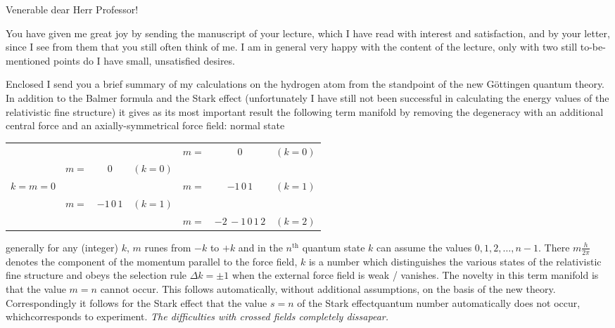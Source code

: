 \date{November 17, 1925}

Venerable dear Herr Professor!

You have given me great joy by sending the manuscript of your lecture, which I have read with interest and satisfaction, and by your letter, since I see from them that you still often think of me. I am in general very happy with the content of the lecture, only with two still to-be-mentioned points do I have small, unsatisfied desires.

Enclosed I send you a brief summary of my calculations on the hydrogen atom from the standpoint of the new G\"ottingen quantum theory. In addition to the Balmer formula and the Stark effect (unfortunately I have still not been successful in calculating the energy values of the relativistic fine structure) it gives as its most important result the following term manifold by removing the degeneracy with an additional central force and an axially-symmetrical force field: normal state
\begin{tabular}{ccccccc}
\, & \, & \, & \, & $m=$ & $0$ & $(k=0)$\\
\, & $m=$ & $0$ & $(k=0)$ & \, &\, & \, \\
$k=m=0$ & \, & \, & \, & $m=$ & $-1\,0\,1$ & $(k=1)$ \\
\, & $m=$ & $-1\,0\,1$ & $(k=1)$ & \, &\, & \, \\
\, & \, & \, & \, & $m=$ & $-2\,-1\,0\,1\,2$ & $(k=2)$\\
\end{tabular}
generally for any (integer) $k$, $m$ runes from $-k$ to $+k$ and in the $n^\text{th}$ quantum state $k$ can assume the values $0,1,2,\dots,n-1$. There $m\frac{h}{2\pi}$ denotes the component of the momentum parallel to the force field, $k$ is a number which distinguishes the various states of the relativistic fine structure and obeys the selection rule $\Delta k = \pm 1$ when the external force field is weak / vanishes. The novelty in this term manifold is that the value $m=n$ cannot occur. This follows automatically, without additional assumptions, on the basis of the new theory. Correspondingly it follows for the Stark effect that the value $s=n$ of the Stark effectquantum number automatically does not occur, whichcorresponds to experiment.
 \textit{The difficulties with crossed fields completely dissapear.}
 
